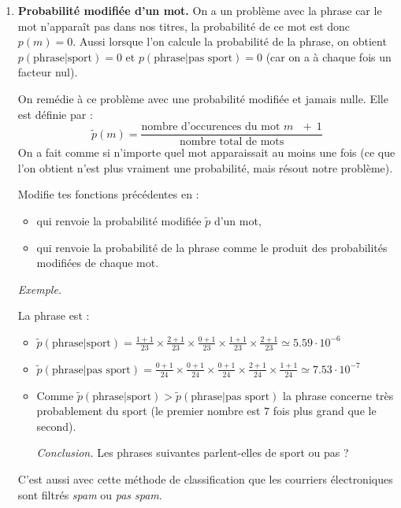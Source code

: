 \documentclass[11pt,class=report,crop=false]{standalone}
\begin{document}
\begin{activite}
\begin{enumerate}
		
	\item \textbf{Probabilité modifiée d'un mot.}
	On a un problème avec la phrase  car le mot  n'apparaît pas dans nos titres, la probabilité de ce mot est donc $p(m) = 0$.
	Aussi lorsque l'on calcule la probabilité de la phrase, on obtient
	$p(\text{phrase}|\text{sport}) = 0$ et $p(\text{phrase}|\text{pas sport})=0$ (car on a à chaque fois un facteur nul).
	
	On remédie à ce problème avec une probabilité modifiée et jamais nulle. Elle est définie par :
	$$\tilde p(m) = \frac{\text{nombre d'occurences du mot } m \ \ \ + \ 1}{\text{nombre total de mots}}$$
	On a fait comme si n'importe quel mot apparaissait au moins une fois (ce que l'on obtient n'est plus vraiment une probabilité, mais résout notre problème).
	
	Modifie tes fonctions précédentes en :
	\begin{itemize}
		\item  {} qui renvoie la probabilité modifiée $\tilde p$ d'un mot,
		\item  {} qui renvoie la probabilité de la phrase comme le produit des probabilités modifiées de chaque mot.
	\end{itemize}
	
	\medskip
	
 	\emph{Exemple.}

La phrase est  :
\begin{itemize} 
	\item $\tilde p(\text{phrase}|\text{sport}) = 
\frac{1+1}{23} \times \frac{2+1}{23} \times \frac{0+1}{23} \times \frac{1+1}{23} \times \frac{2+1}{23} \simeq 5.59 \cdot 10^{-6}$

	\item $\tilde p(\text{phrase}|\text{pas sport}) = \frac{0+1}{24} \times \frac{0+1}{24} \times \frac{0+1}{24} \times \frac{2+1}{24}  \times \frac{1+1}{24} \simeq 7.53\cdot 10^{-7}$
	\item Comme $\tilde p(\text{phrase}|\text{sport}) > \tilde p(\text{phrase}|\text{pas sport})$ la phrase concerne très probablement du sport (le premier nombre est $7$ fois plus grand que le second).
	\medskip

\emph{Conclusion.}
Les phrases suivantes parlent-elles de sport ou pas ?

		
\end{itemize}	 

\bigskip

C'est aussi avec cette méthode de classification que les courriers électroniques sont filtrés \emph{spam} ou \emph{pas spam}.	
	
\end{enumerate}
\end{activite}
\end{document}
